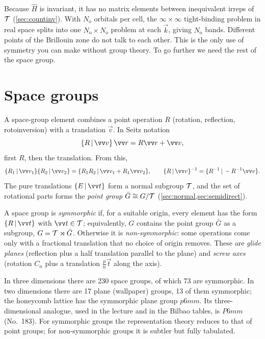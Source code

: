Because $\hat{H}$ is invariant, it has no matrix elements between inequivalent irreps
of $\mathcal{T}$ (\cref{sec:countinv}). With $N_{\mathrm{o}}$ orbitals per cell, the
$\infty\times\infty$ tight-binding problem in real space splits into one
$N_{\mathrm{o}}\times N_{\mathrm{o}}$ problem at each $\vec{k}$, giving $N_{\mathrm{o}}$ bands.
Different points of the Brillouin zone do not talk to each other. This is the only
use of symmetry you can make without group theory. To go further we need the rest of
the space group.

\section{Space groups}

A space-group element combines a point operation $R$ (rotation, reflection,
rotoinversion) with a translation $\vec{v}$. In Seitz notation
\begin{equation}
\seitz{R}{\vec{v}}\,\vec{r}=R\vec{r}+\vec{v},
\end{equation}
first $R$, then the translation. From this,
\begin{equation}\label{eq:seitz}
\seitz{R_1}{\vec{v}_1}\seitz{R_2}{\vec{v}_2}=\seitz{R_1R_2}{\vec{v}_1+R_1\vec{v}_2},\qquad
\seitz{R}{\vec{v}}^{-1}=\seitz{R^{-1}}{-R^{-1}\vec{v}}.
\end{equation}
The pure translations $\seitz{E}{\vec{t}}$ form a normal subgroup $\mathcal{T}$, and the set
of rotational parts forms the \emph{point group} $\bar{G}\cong G/\mathcal{T}$
(\cref{sec:normal,sec:semidirect}).

\begin{definition}
A space group is \emph{symmorphic} if, for a suitable origin, every element has the
form $\seitz{R}{\vec{t}}$ with $\vec{t}\in\Tgroup$; equivalently, $G$ contains the point
group $\bar{G}$ as a subgroup, $G=\mathcal{T}\rtimes\bar{G}$. Otherwise it is
\emph{non-symmorphic}: some operations come only with a fractional translation that
no choice of origin removes. These are \emph{glide planes} (reflection plus a half
translation parallel to the plane) and \emph{screw axes} (rotation $C_n$ plus a
translation $\tfrac{p}{n}\vec{t}$ along the axis).
\end{definition}
In three dimensions there are 230 space groups, of which 73 are symmorphic. In two
dimensions there are 17 plane (wallpaper) groups, 13 of them symmorphic; the
honeycomb lattice has the symmorphic plane group $p6mm$. Its three-dimensional
analogue, used in the lecture and in the Bilbao tables, is $P6mm$ (No.~183). For
symmorphic groups the representation theory reduces to that of point groups; for
non-symmorphic groups it is subtler but fully tabulated.

